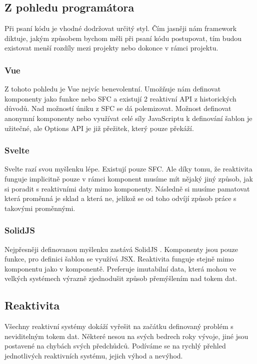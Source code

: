 \documentclass[
  master,
  program=ainf,
  tables=false,
  sourcecodes,
  glossaries,
  index
]{kidiplom}
\begin{document}
\subsection{Z pohledu programátora}
Při psaní kódu je vhodné dodržovat určitý styl. Čím jasněji nám framework diktuje, jakým způsobem bychom
měli při psaní kódu postupovat, tím budou existovat menší rozdíly mezi projekty nebo dokonce v rámci projektu.

\subsubsection{Vue}
Z tohoto pohledu je Vue \cite{vue} nejvíc benevolentní. Umožňuje nám definovat komponenty jako funkce nebo SFC a existují
2 reaktivní API z historických důvodů. Nad možností úniku z SFC se dá polemizovat. Možnost definovat anonymní
komponenty nebo využívat celé síly JavaScriptu \cite{js} k definování šablon je užitečné, ale Options API je již přežitek,
který pouze překáží. 

\subsubsection{Svelte}
Svelte \cite{svelte} razí svou myšlenku lépe. Existují pouze SFC. Ale díky tomu, že reaktivita funguje implicitně pouze v rámci
komponent musíme mít nějaký jiný způsob, jak si poradit s reaktivními daty mimo komponenty. Následně si musíme
pamatovat která proměnná je sklad a která ne, jelikož se od toho odvíjí způsob práce s takovými proměnnými.

\subsubsection{SolidJS}
Nejpřesněji definovanou myšlenku zastává SolidJS \cite{solidjs}. Komponenty jsou pouze funkce, pro definici šablon se využívá
JSX. Reaktivita funguje stejně mimo komponentu jako v komponentě. Preferuje imutabilní data, která mohou ve 
velkých systémech výrazně zjednodušit způsob přemýšlením nad tokem dat.

\subsection{Reaktivita}
Všechny reaktivní systémy dokáží vyřešit na začátku definovaný problém s neviditelným tokem dat. 
Některé nesou na svých bedrech roky vývoje, jiné jsou postavené na chybách svých předchůdců. Podíváme se na rychlý
přehled jednotlivých reaktivních systému, jejich výhod a nevýhod.
\end{document}
